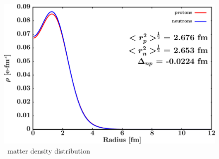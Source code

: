 \begin{figure}[hbtp]
    \centering
    \begin{minipage}{0.70\textwidth}
        \centering
        \includegraphics[width=\linewidth]{figures/o16_matterDensity.png}
        \caption*{\oSix\ matter density distribution}
        \label{DOMFitData_o16_matterDensity}
    \end{minipage}
\end{figure}


